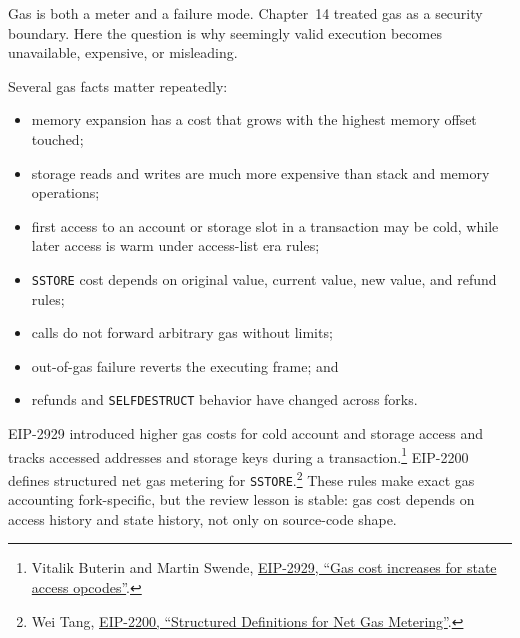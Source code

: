 Gas is both a meter and a failure mode. Chapter~14 treated gas as a security boundary. Here the question is why seemingly valid execution becomes unavailable, expensive, or misleading.

Several gas facts matter repeatedly:

\begin{itemize}
\item memory expansion has a cost that grows with the highest memory offset touched;
\item storage reads and writes are much more expensive than stack and memory operations;
\item first access to an account or storage slot in a transaction may be cold, while later access is warm under access-list era rules;
\item \texttt{SSTORE} cost depends on original value, current value, new value, and refund rules;
\item calls do not forward arbitrary gas without limits;
\item out-of-gas failure reverts the executing frame; and
\item refunds and \texttt{SELFDESTRUCT} behavior have changed across forks.
\end{itemize}

EIP-2929 introduced higher gas costs for cold account and storage access and tracks accessed addresses and storage keys during a transaction.\footnote{Vitalik Buterin and Martin Swende, \href{https://eips.ethereum.org/EIPS/eip-2929}{EIP-2929, ``Gas cost increases for state access opcodes''}.} EIP-2200 defines structured net gas metering for \texttt{SSTORE}.\footnote{Wei Tang, \href{https://eips.ethereum.org/EIPS/eip-2200}{EIP-2200, ``Structured Definitions for Net Gas Metering''}.} These rules make exact gas accounting fork-specific, but the review lesson is stable: gas cost depends on access history and state history, not only on source-code shape.

